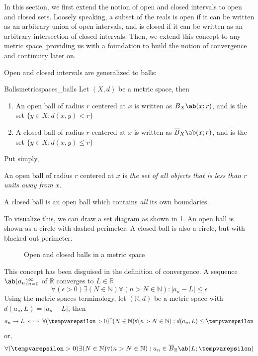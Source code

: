 In this section, we first extend the notion of open and closed intervals to open and closed sets.
Loosely speaking, a subset of the reals is open if it can be written as an arbitrary
union of open intervals, and is closed if it can be written as an arbitrary intersection of
closed intervals. Then, we extend this concept to any metric space, providing us
with a foundation to build the notion of convergence and continuity later on.

Open and closed intervals are generalized to balls:
\begin{df}{Balls}{metricspaces_balls}
  Let \((X, d)\) be a metric space, then  
  \begin{enumerate}{}
    \item An open ball of radius \(r\) centered at \(x\) is written as \(\oball{X}{x}{r}\),
          and is the set \(\{y \in X : d(x, y) < r\}\)
    \item A closed ball of radius \(r\) centered at \(x\) is written as \(\cball{X}{x}{r}\),
          and is the set \(\{y \in X : d(x, y) \leq r\}\)
  \end{enumerate}
\end{df}

Put simply,
\begin{displayquote}
  An open ball of radius \(r\) centered at \(x\) is \emph{the set of all objects that
  is less than \(r\) units away from \(x\)}.

  A closed ball is an open ball which contains \emph{all} its own boundaries.
\end{displayquote}

To visualize this, we can draw a set diagram as shown in
\cref{fig:metricspaces-open_and_closed_balls}. An open ball is shown as a circle with
dashed perimeter. A closed ball is also a circle, but with blacked out perimeter.

\begin{figure}[ht]
  \centering
  
  \caption{Open and closed balls in a metric space}
  \label{fig:metricspaces-open_and_closed_balls}
\end{figure}

This concept has been disguised in the definition of convergence. A sequence
\(\sequence{a_n}{n = 0}{\infty}\) of \(\mathbb{R}\) converges to \(L \in \mathbb{R}\) \ifft
\begin{equation}
  \forall (\epsilon > 0) \exists (N \in \mathbb{N}) \forall (n > N \in \mathbb{N}) : |a_n - L| \leq \epsilon
\end{equation}
Using the metric spaces terminology, let \((\mathbb{R}, d)\) be a metric space with
\(d(a_n, L) = |a_n - L|\), then
\begin{equation}
  a_n \appr L \iff \forall (\epsilon > 0) \exists (N \in \mathbb{N}) \forall (n > N \in \mathbb{N}) : d(a_n, L)
              \leq \epsilon
\end{equation}
or,
\begin{equation}
  \forall (\epsilon > 0) \exists (N \in \mathbb{N}) \forall (n > N \in \mathbb{N}) : a_n \in \cball{\mathbb{R}}{L}{\epsilon}
\end{equation}


